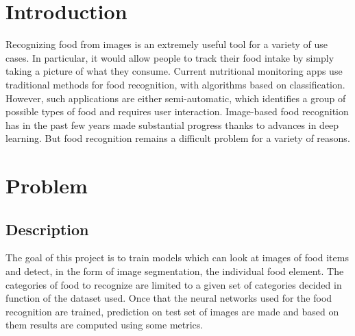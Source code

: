 \documentclass[a4paper,10pt]{report}
\begin{document}
{\let\clearpage\relax\par \chapter{Introduction}\label{chap:introduction}
Recognizing food from images is an extremely useful tool for a variety of use cases. In particular, it would allow people to track their food intake by simply taking a picture of what they consume. Current nutritional monitoring apps use traditional methods for food recognition, with algorithms based on classification. However, such applications are either semi-automatic, which identifies a
group of possible types of food and requires user interaction.
Image-based food recognition has in the past few years made substantial progress thanks to advances in deep learning. But food recognition remains a difficult problem for a variety of reasons.



\chapter{Problem}\label{chap:problem}

\section{Description}\label{sec:section-21}
The goal of this project is to train models which can look at images of food items and detect, in the form of image segmentation, the individual food element. The categories of food to recognize are limited to a given set of categories decided in function of the dataset used. Once that the neural networks used for the food recognition are trained, prediction on test set of images are made and based on them results are computed using some metrics.


}
\end{document}

